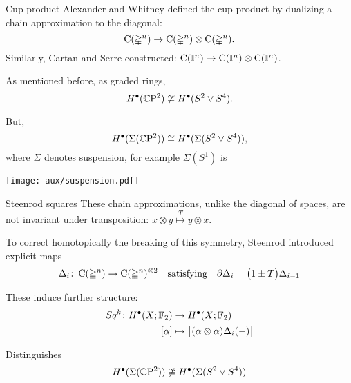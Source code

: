 
\begin{frame}[fragile]{Cup product}
	\pause Alexander and Whitney defined the cup product by dualizing a chain approximation to the diagonal:
	\[
	\operatorname{C}(\mathbb{\Delta}^n) \to \operatorname{C}(\mathbb{\Delta}^n) \otimes \operatorname{C}(\mathbb{\Delta}^n).
	\]
	\pause Similarly, Cartan and Serre constructed: $\operatorname{C}(\mathbb{I}^n) \to \operatorname{C}(\mathbb{I}^n) \otimes \operatorname{C}(\mathbb{I}^n)$.

	\bigskip\pause
	As mentioned before, as graded rings,
	\[
	H^\bullet(\mathbb{C} \mathrm{P}^2) \not\cong H^\bullet(S^2 \vee S^4).
	\]

	\vskip -8pt \pause But,
	\[
	H^\bullet(\Sigma(\mathbb{C} \mathrm{P}^2)) \cong H^\bullet(\Sigma(S^2 \vee S^4)),
	\]
	where $\Sigma$ denotes suspension, for example $\Sigma(S^1)$ is
	\begin{center}
		\texttt{[image: aux/suspension.pdf]}
	\end{center}
\end{frame}

\begin{frame}{Steenrod squares}
	\pause These chain approximations, unlike the diagonal of spaces, are \textcolor{pblue}{not} invariant under transposition: $x \otimes y \stackrel{T}{\mapsto} y \otimes x$.
	\begin{center}
	\end{center}

	\smallskip\pause To correct homotopically the breaking of this symmetry, Steenrod introduced explicit maps
	\[
	\Delta_i \colon \operatorname{C}(\mathbb{\Delta}^n) \to \operatorname{C}(\mathbb{\Delta}^n)^{\otimes 2}
	\quad \text{satisfying} \quad
	\partial \Delta_{i} = \big(1 \pm T \big) \Delta_{i-1}
	\]

	\pause

	These induce further structure:
	\[
	\begin{split}
		Sq^k \colon H^\bullet(X; {\mathbb{F}_2}) &\to H^\bullet(X; {\mathbb{F}_2}) \\
		[\alpha] &\mapsto \big[ (\alpha \otimes \alpha) \Delta_i(-) \big]
	\end{split}
	\]

	\vskip-8pt\pause

	\textcolor{pblue}{Distinguishes}
	\[
	H^\bullet(\Sigma(\mathbb{C} \mathrm{P}^2)) \not\cong H^\bullet(\Sigma(S^2 \vee S^4))
	\]
\end{frame}

